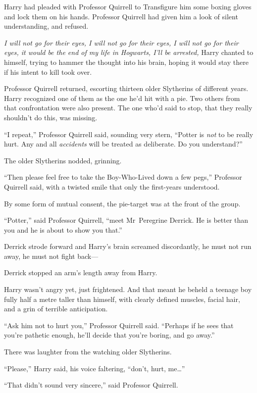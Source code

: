 Harry had pleaded with Professor Quirrell to Transfigure him some boxing gloves and lock them on his hands. Professor Quirrell had given him a look of silent understanding, and refused.

\emph{I will not go for their eyes, I will not go for their eyes, I will not go for their eyes, it would be the end of my life in Hogwarts, I’ll be arrested,} Harry chanted to himself, trying to hammer the thought into his brain, hoping it would stay there if his intent to kill took over.

Professor Quirrell returned, escorting thirteen older Slytherins of different years. Harry recognized one of them as the one he’d hit with a pie. Two others from that confrontation were also present. The one who’d said to stop, that they really shouldn’t do this, was missing.

“I repeat,” Professor Quirrell said, sounding very stern, “Potter is \emph{not} to be really hurt. Any and all \emph{accidents} will be treated as deliberate. Do you understand?”

The older Slytherins nodded, grinning.

“Then please feel free to take the Boy-Who-Lived down a few pegs,” Professor Quirrell said, with a twisted smile that only the first-years understood.

By some form of mutual consent, the pie-target was at the front of the group.

“Potter,” said Professor Quirrell, “meet Mr~Peregrine Derrick. He is better than you and he is about to show you that.”

Derrick strode forward and Harry’s brain screamed discordantly, he must not run away, he must not fight back—

Derrick stopped an arm’s length away from Harry.

Harry wasn’t angry yet, just frightened. And that meant he beheld a teenage boy fully half a metre taller than himself, with clearly defined muscles, facial hair, and a grin of terrible anticipation.

“Ask him not to hurt you,” Professor Quirrell said. “Perhaps if he sees that you’re pathetic enough, he’ll decide that you’re boring, and go away.”

There was laughter from the watching older Slytherins.

“Please,” Harry said, his voice faltering, “don’t, hurt, me…”

“That didn’t sound very sincere,” said Professor Quirrell.

